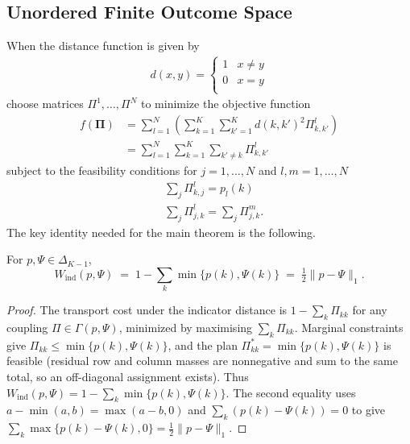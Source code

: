 \subsection{Unordered Finite Outcome Space}
\label{sec:unordered}
When the distance function is given by
\begin{align*}
d(x,y)= \left\{
\begin{array}{ll}
      1 & x\neq y \\
      0 & x=y \\
\end{array} 
\right.
\end{align*}
choose matrices $\Pi^1,\ldots,\Pi^N$ to minimize the objective function
\begin{align*}
f(\mathbf{\Pi})&=\sum_{l=1}^N\left(\sum_{k=1}^K\sum_{k'=1}^K d(k,k')^2\Pi^l_{k,k'}\right) \\
&=\sum_{l=1}^N\sum_{k=1}^K\sum_{k'\neq k}\Pi^l_{k,k'}
\end{align*}
subject to the feasibility conditions for $j=1,\ldots,N$ and $l,m=1,\ldots,N$
\begin{align*}
&\sum_j\Pi^l_{k,j}=p_l(k) \\
&\sum_j\Pi^l_{j,k}=\sum_j\Pi^m_{j,k}.
\end{align*}
The key identity needed for the main theorem is the following.

\begin{lemma}
\label{lem:ot_diagonal}
For $p, \Psi \in \Delta_{K-1}$,
\[
  W_{\mathrm{ind}}(p,\Psi) \;=\; 1 - \sum_k \min\{p(k),\Psi(k)\} \;=\; \tfrac{1}{2}\|p - \Psi\|_1.
\]
\end{lemma}
\begin{proof}
The transport cost under the indicator distance is $1 - \sum_k \Pi_{kk}$ for any coupling $\Pi \in \Gamma(p,\Psi)$, minimized by maximising $\sum_k \Pi_{kk}$.  Marginal constraints give $\Pi_{kk} \leq \min\{p(k),\Psi(k)\}$, and the plan $\Pi^*_{kk} = \min\{p(k),\Psi(k)\}$ is feasible (residual row and column masses are nonneg\-ative and sum to the same total, so an off-diagonal assignment exists).  Thus $W_{\mathrm{ind}}(p,\Psi) = 1 - \sum_k \min\{p(k),\Psi(k)\}$.  The second equality uses $a - \min(a,b) = \max(a-b,0)$ and $\sum_k(p(k)-\Psi(k)) = 0$ to give $\sum_k\max\{p(k)-\Psi(k),0\} = \tfrac{1}{2}\|p-\Psi\|_1$.
\end{proof}

